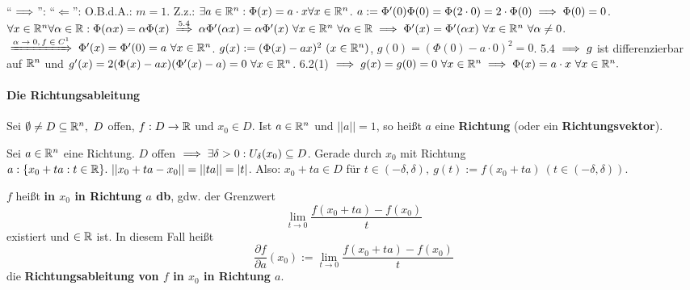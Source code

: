 \documentclass[a4paper,twoside,DIV15,BCOR12mm,chapterprefix=true,headings=twolinechapter]{scrbook}
\begin{document}
\begin{beweis}
``$\implies$'':
``$\Leftarrow$'': O.B.d.A.: $m=1$. Z.z.: $\exists a \in \mathbb{R}^n:\Phi(x)=a\cdot x \forall x \in \mathbb{R}^n$.
$a:=\Phi'(0) \Phi(0)=\Phi(2\cdot0)=2\cdot \Phi(0) \implies \Phi(0)=0$.
$\forall x \in \MdR^n \forall \alpha \in \MdR: \Phi(\alpha x)=\alpha\Phi(x) \folgtnach{5.4} \alpha \Phi'(\alpha x)=\alpha\Phi'(x)\ \forall x \in \MdR^n\ \forall \alpha \in \MdR
\folgt \Phi'(x)=\Phi'(\alpha x)\ \forall x \in\MdR^n\ \forall\alpha\ne0$.$ \folgtnach{$\alpha\to0, f\in C^1$} \Phi'(x)=\Phi'(0)=a\ \forall x \in\MdR^n$.
$g(x):=(\Phi(x)-ax)^2\ (x \in \mathbb{R}^n)$, $ g(0)=(\Phi(0)-a\cdot0)^2=0$.
5.4 $\implies g$ ist differenzierbar auf $\mathbb{R}^n$ und $g'(x)=2(\Phi(x)-ax)(\Phi'(x)-a)=0\ \forall x \in \mathbb{R}^n$.
6.2(1) $\folgt g(x)=g(0)=0\ \forall x\in\MdR^n \folgt \Phi(x)=a\cdot x\ \forall x\in \MdR^n.$
\end{beweis}

\paragraph{Die Richtungsableitung}
Sei $\emptyset \ne D \subseteq \MdR^n,\ D$ offen, $f:D \to \mathbb{R}$ und $x_0 \in D$. Ist $a \in \mathbb{R}^n$ und $||a||=1$, so heißt $a$ eine \textbf{Richtung} (oder ein \textbf{Richtungsvektor}).

Sei $a \in \mathbb{R}^n$ eine Richtung. $D$ offen $\implies \exists \delta>0: U_\delta(x_0) \subseteq D$. Gerade durch $x_0$ mit Richtung $a:\{x_0+ta:t\in\mathbb{R}\}.\  ||x_0+ta-x_0|| = ||ta|| = |t|$. Also: $x_0+ta \in D$ für $t \in (-\delta,\delta),\ g(t) := f(x_0+ta)\ (t \in (-\delta,\delta))$.

$f$ heißt \textbf{in $x_0$ in Richtung $a$ db}, gdw. der Grenzwert $$\lim_{t\to 0} \frac{f(x_0+ta)-f(x_0)}{t}$$ existiert und $\in \mathbb{R}$ ist. In diesem Fall heißt $$\frac{\partial f}{\partial a}(x_0) := \lim_{t\to 0} \frac{f(x_0+ta)-f(x_0)}{t}$$ die \textbf{Richtungsableitung von $f$ in $x_0$ in Richtung $a$}.
\end{document}
